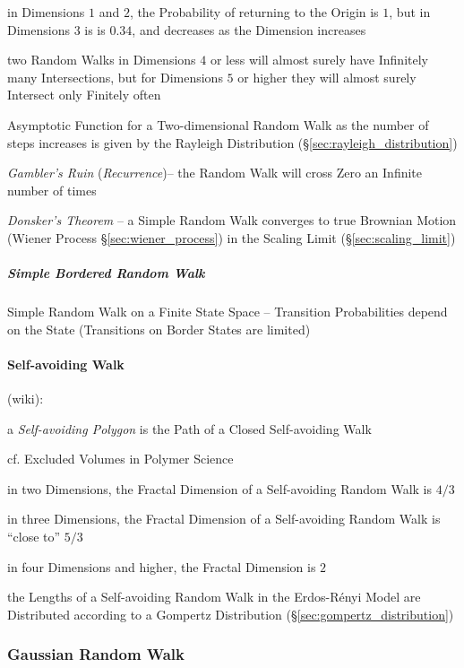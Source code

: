 in Dimensions $1$ and $2$, the Probability of returning to the Origin is $1$,
but in Dimensions $3$ is is $0.34$, and decreases as the Dimension increases

two Random Walks in Dimensions $4$ or less will almost surely have Infinitely
many Intersections, but for Dimensions $5$ or higher they will almost surely
Intersect only Finitely often

Asymptotic Function for a Two-dimensional Random Walk as the number of steps
increases is given by the Rayleigh Distribution
(\S\ref{sec:rayleigh_distribution})

\emph{Gambler's Ruin} (\emph{Recurrence})-- the Random Walk will cross Zero an
Infinite number of times

\emph{Donsker's Theorem} -- a Simple Random Walk converges to true Brownian
Motion (Wiener Process \S\ref{sec:wiener_process}) in the Scaling Limit
(\S\ref{sec:scaling_limit})



\subparagraph{Simple Bordered Random Walk}\label{sec:simple_bordered_walk}\hfill

Simple Random Walk on a Finite State Space -- Transition Probabilities depend on
the State (Transitions on Border States are limited)



\paragraph{Self-avoiding Walk}\label{sec:selfavoiding_walk}\hfill

(wiki):

a \emph{Self-avoiding Polygon} is the Path of a Closed Self-avoiding Walk

cf. Excluded Volumes in Polymer Science

in two Dimensions, the Fractal Dimension of a Self-avoiding Random Walk is $4/3$

in three Dimensions, the Fractal Dimension of a Self-avoiding Random Walk is
``close to'' $5/3$

in four Dimensions and higher, the Fractal Dimension is $2$

the Lengths of a Self-avoiding Random Walk in the Erdos-R\'enyi Model are
Distributed according to a Gompertz Distribution
(\S\ref{sec:gompertz_distribution})



\subsubsection{Gaussian Random Walk}\label{sec:gaussian_random_walk}


